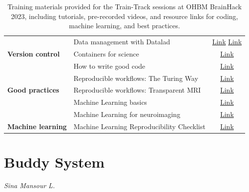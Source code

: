 \documentclass{article}
\newcommand\coordinator[1]{\begin{flushleft}\small\textit{#1}\end{flushleft}}
\begin{document}
\begin{table}[]
\begin{tabular}{|l|l|c|}
                                                & Data management with Datalad                   & \href{https://psy6983.brainhackmtl.org/modules/datalad/}{Link} \href{https://youtu.be/QsAqnP7TwyY}{Link}      \\ \cline{2-3} 
    \multirow{-5}{*}{\textbf{Version control}}  & Containers for science                         & \href{https://youtu.be/pc3YOZUG3lQ}{Link}                                                                                \\ \hline
                                                & How to write good code                         & \href{https://youtu.be/gfPP2pQ8Rms}{Link}                                                                                \\ \cline{2-3} 
                                                & Reproducible workflows: The Turing Way         & \href{https://youtu.be/tk2eZSrM8oA}{Link}                                                                                \\ \cline{2-3} 
    \multirow{-3}{*}{\textbf{Good practices}}   & Reproducible workflows: Transparent MRI        & \href{https://youtu.be/dSOQgyuL51U}{Link}                                                                                \\ \hline
                                                & Machine Learning basics                        & \href{https://psy6983.brainhackmtl.org/modules/machine\_learning\_basics/}{Link}                                         \\ \cline{2-3} 
                                                & Machine Learning for neuroimaging              & \href{https://psy6983.brainhackmtl.org/modules/machine\_learning\_neuroimaging/}{Link}                                   \\ \cline{2-3} 
    \multirow{-3}{*}{\textbf{Machine learning}} & Machine Learning Reproducibility Checklist     & \href{https://www.cs.mcgill.ca/$\sim$jpineau/ReproducibilityChecklist.pdf}{Link}                                         \\ \hline
    \end{tabular}
    \caption{Training materials provided for the Train-Track sessions at OHBM BrainHack 2023, including tutorials, pre-recorded videos, and resource links for coding, machine learning, and best practices.}
    \label{tab:traintrack-material}
\end{table}

\section{Buddy System}
\coordinator{Sina Mansour L.}
\end{document}
